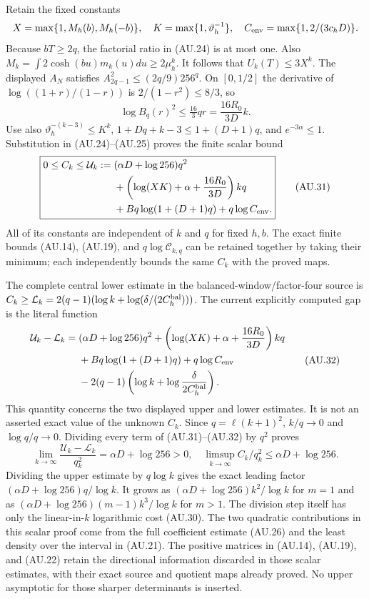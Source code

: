 \documentclass[11pt]{article}
\begin{document}
Retain the fixed constants
\[
 X=\max\{1,M_h(b),M_h(-b)\},\quad
 K=\max\{1,\vartheta_h^{-1}\},\quad
 C_{\rm env}=\max\{1,2/(3c_hD)\}.
\]
Because $bT\ge2q$, the factorial ratio in (AU.24) is at most one.
Also $M_k=\int2\cosh(bu)m_k(u)du\ge2\mu_h^k$.
It follows that $U_k(T)\le3X^k$.
The displayed $A_N$ satisfies
$A_{2q-1}^2\le(2q/9)256^q$.
On $[0,1/2]$ the derivative of $\log((1+r)/(1-r))$ is
$2/(1-r^2)\le8/3$, so
\[
 \log B_q(r)^2\le\tfrac{16}{3}qr
                         =\frac{16R_0}{3D}k.             \tag{AU.30}
\]
Use also $\vartheta_h^{-(k-3)}\le K^k$,
$1+Dq+k-3\le1+(D+1)q$, and $e^{-3\alpha}\le1$.
Substitution in (AU.24)--(AU.25) proves the finite scalar bound
\[
 \boxed{\begin{aligned}
 0\le C_k\le\mathcal U_k:={}&(\alpha D+\log256)q^2\\
 &+\left(\log(XK)+\alpha+\frac{16R_0}{3D}\right)kq\\
 &+Bq\log(1+(D+1)q)+q\log C_{\rm env}.
 \end{aligned}}                                             \tag{AU.31}
\]
All of its constants are independent of $k$ and $q$ for fixed $h,b$.
The exact finite bounds (AU.14), (AU.19), and $q\log\mathcal C_{k,q}$
can be retained together by taking their minimum; each independently
bounds the same $C_k$ with the proved maps.

The complete central lower estimate in the balanced-window/factor-four
source is
$C_k\ge\mathcal L_k=2(q-1)(\log k+\log(\delta/(2C_h^{\rm bal})))$.
The current explicitly computed gap is the literal function
\[
 \begin{split}
 \mathcal U_k-\mathcal L_k
  ={}&(\alpha D+\log256)q^2
   +\left(\log(XK)+\alpha+\frac{16R_0}{3D}\right)kq
   \\
   &+Bq\log(1+(D+1)q)+q\log C_{\rm env}\\
   &-2(q-1)\left(\log k+\log\frac{\delta}{2C_h^{\rm bal}}\right).
 \end{split}
 \tag{AU.32}
\]
This quantity concerns the two displayed upper and lower estimates.
It is not an asserted exact value of the unknown $C_k$.
Since $q=\ell(k+1)^2$, $k/q\to0$ and $\log q/q\to0$.
Dividing every term of (AU.31)--(AU.32) by $q^2$ proves
\[
 \lim_{k\to\infty}\frac{\mathcal U_k-\mathcal L_k}{q_k^2}
       =\alpha D+\log256>0,
 \quad
 \limsup_{k\to\infty}C_k/q_k^2\le\alpha D+\log256.
 \tag{AU.33}
\]
Dividing the upper estimate by $q\log k$ gives the exact leading
factor $(\alpha D+\log256)q/\log k$. It grows as
$(\alpha D+\log256)k^2/\log k$ for $m=1$ and as
$(\alpha D+\log256)(m-1)k^3/\log k$ for $m>1$.
The division step itself has only the linear-in-$k$ logarithmic cost
(AU.30). The two quadratic contributions in this scalar proof come
from the full coefficient estimate (AU.26) and the least density over
the interval in (AU.21). The positive matrices in (AU.14), (AU.19),
and (AU.22) retain the directional information discarded in those
scalar estimates, with their exact source and quotient maps already
proved. No upper asymptotic for those sharper determinants is inserted.
\end{document}
